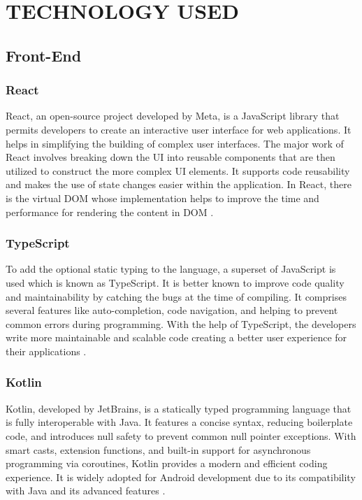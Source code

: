 \chapter{TECHNOLOGY USED}

\section{Front-End}

\subsection{React}
React, an open-source project developed by Meta, is a JavaScript library that permits developers to create an interactive user interface for web applications. It helps in simplifying the building of complex user interfaces. The major work of React involves breaking down the UI into reusable components that are then utilized to construct the more complex UI elements. It supports code reusability and makes the use of state changes easier within the application. In React, there is the virtual DOM whose implementation helps to improve the time and performance for rendering the content in DOM \cite{react2025}.

\subsection{TypeScript}
To add the optional static typing to the language, a superset of JavaScript is used which is known as TypeScript. It is better known to improve code quality and maintainability by catching the bugs at the time of compiling. It comprises several features like auto-completion, code navigation, and helping to prevent common errors during programming. With the help of TypeScript, the developers write more maintainable and scalable code creating a better user experience for their applications \cite{typescript2025}.

\subsection{Kotlin}
Kotlin, developed by JetBrains, is a statically typed programming language that is fully interoperable with Java. It features a concise syntax, reducing boilerplate code, and introduces null safety to prevent common null pointer exceptions. With smart casts, extension functions, and built-in support for asynchronous programming via coroutines, Kotlin provides a modern and efficient coding experience. It is widely adopted for Android development due to its compatibility with Java and its advanced features \cite{kotlin2025}.

